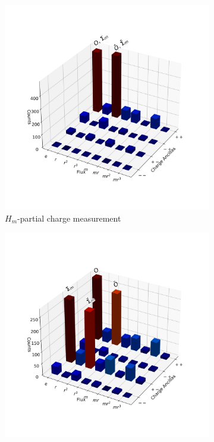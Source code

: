 \documentclass[a4paper,twocolumn,11pt, accepted=2024-06-14]{quantumarticle}
\begin{document}
\begin{figure}
    \centering
    \begin{subfigure}{0.49\linewidth}
        \centering
        \includegraphics[width=\linewidth]{Figures/glasses_m.png}
        \caption{$H_m$-partial charge measurement}
        \label{fig:glasses_Hm}
    \end{subfigure}
    \begin{subfigure}{0.49\linewidth}
        \centering
        \includegraphics[width=\linewidth]{Figures/glasses_mr.png}

\end{subfigure}
\end{figure}
\end{document}
